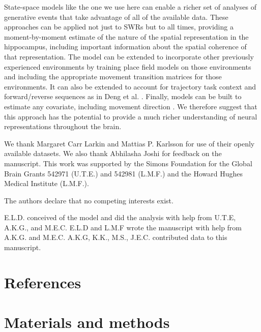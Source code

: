 \documentclass[times, twoside]{zHenriquesLab-StyleBioRxiv}
\begin{document}
State-space models like the one we use here can enable a richer set of analyses of generative events that take advantage of all of the available data. These approaches can be applied not just to SWRs but to all times, providing a moment-by-moment estimate of the nature of the spatial representation in the hippocampus, including important information about the spatial coherence of that representation. The model can be extended to incorporate other previously experienced environments by training place field models on those environments and including the appropriate movement transition matrices for those environments. It can also be extended to account for trajectory task context and forward/reverse sequences as in Deng et al. \cite{DengRapidclassificationhippocampal2016}. Finally, models can be built to estimate any covariate, including movement direction \cite{KayConstantSubsecondCycling2020}. We therefore suggest that this approach has the potential to provide a much richer understanding of neural representations throughout the brain. 

\begin{acknowledgements}
We thank Margaret Carr Larkin and Mattias P. Karlsson for use of their openly available datasets. We also thank Abhilasha Joshi for feedback on the manuscript. This work was supported by the Simons Foundation for the Global Brain Grants 542971 (U.T.E.) and 542981 (L.M.F.) and the Howard Hughes Medical Institute (L.M.F.).
\end{acknowledgements}

\begin{interests}
The authors declare that no competing interests exist.
\end{interests}

\begin{contributions}
E.L.D. conceived of the model and did the analysis with help from U.T.E, A.K.G., and M.E.C. E.L.D and L.M.F wrote the manuscript with help from A.K.G. and M.E.C. A.K.G, K.K., M.S., J.E.C. contributed data to this manuscript.
\end{contributions}

\section*{References}


\onecolumn
\newpage

\section*{Materials and methods}
\end{document}

